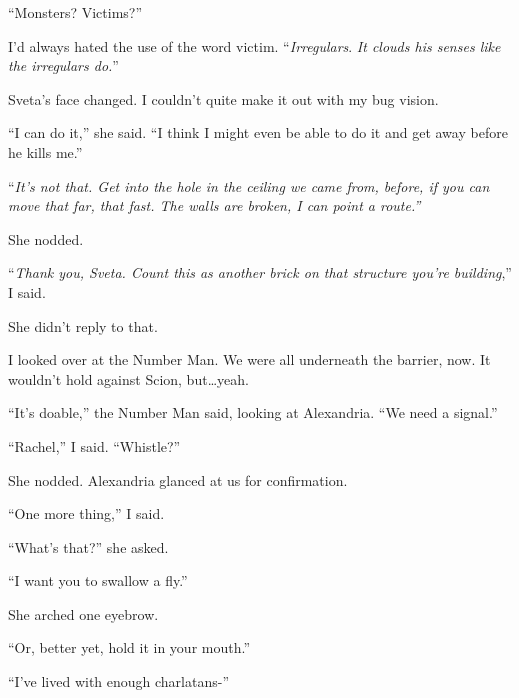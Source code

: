 ``Monsters?  Victims?''



I'd always hated the use of the word victim.  ``\emph{Irregulars}.  \emph{It clouds his senses like the irregulars do.}''



Sveta's face changed.  I couldn't quite make it out with my bug vision.



``I can do it,'' she said.  ``I think I might even be able to do it and get away before he kills me.''



``\emph{It's not that.  Get into the hole in the ceiling we came from, before, if you can move that far, that fast.  The walls are broken, I can point a route.''}



She nodded.



``\emph{Thank you, Sveta.  Count this as another brick on that structure you're building},'' I said.



She didn't reply to that.



I looked over at the Number Man.  We were all underneath the barrier, now.  It wouldn't hold against Scion, but\ldots yeah.



``It's doable,'' the Number Man said, looking at Alexandria.  ``We need a signal.''



``Rachel,'' I said.  ``Whistle?''



She nodded.  Alexandria glanced at us for confirmation.



``One more thing,'' I said.



``What's that?'' she asked.



``I want you to swallow a fly.''



She arched one eyebrow.



``Or, better yet, hold it in your mouth.''



``I've lived with enough charlatans-''



